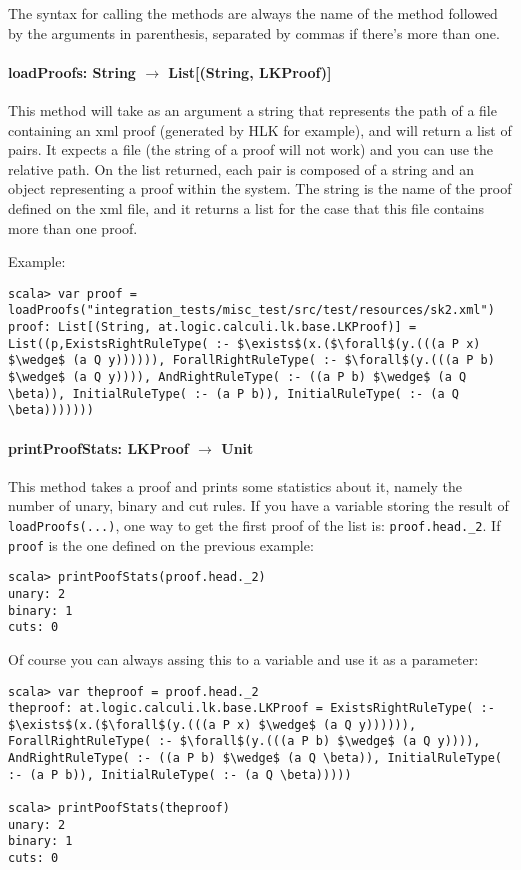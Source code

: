 \documentclass[a4paper, 11pt]{article}
\begin{document}
The syntax for calling the methods are always the name of the method followed by
the arguments in parenthesis, separated by commas if there's more than one.

\paragraph{\textbf{loadProofs: String $\rightarrow$ List[(String, LKProof)]}}
This method will take as an argument a string that represents the path of a file
containing an xml proof (generated by HLK for example), and will return a list 
of pairs. It expects a file (the string of a proof will not work) and you can use 
the relative path. On the list returned, each pair is composed of a string and 
an object representing a proof within the system. The string is the name of the 
proof defined on the xml file, and it returns a list for the case that this file
contains more than one proof.

Example:
\begin{lstlisting}[mathescape]
scala> var proof = loadProofs("integration_tests/misc_test/src/test/resources/sk2.xml")
proof: List[(String, at.logic.calculi.lk.base.LKProof)] = List((p,ExistsRightRuleType( :- $\exists$(x.($\forall$(y.(((a P x) $\wedge$ (a Q y)))))), ForallRightRuleType( :- $\forall$(y.(((a P b) $\wedge$ (a Q y)))), AndRightRuleType( :- ((a P b) $\wedge$ (a Q \beta)), InitialRuleType( :- (a P b)), InitialRuleType( :- (a Q \beta)))))))
\end{lstlisting}

\paragraph{\textbf{printProofStats: LKProof $\rightarrow$ Unit}}
This method takes a proof and prints some statistics about it, namely the number
of unary, binary and cut rules. If you have a variable storing the result of 
\texttt{loadProofs(...)}, one way to get the first proof of the list is: 
\texttt{proof.head.\_2}. If \texttt{proof} is the one defined on the previous 
example:

\begin{lstlisting}
scala> printPoofStats(proof.head._2)
unary: 2
binary: 1
cuts: 0
\end{lstlisting}

Of course you can always assing this to a variable and use it as a parameter:

\begin{lstlisting}
scala> var theproof = proof.head._2
theproof: at.logic.calculi.lk.base.LKProof = ExistsRightRuleType( :- $\exists$(x.($\forall$(y.(((a P x) $\wedge$ (a Q y)))))), ForallRightRuleType( :- $\forall$(y.(((a P b) $\wedge$ (a Q y)))), AndRightRuleType( :- ((a P b) $\wedge$ (a Q \beta)), InitialRuleType( :- (a P b)), InitialRuleType( :- (a Q \beta)))))

scala> printPoofStats(theproof)
unary: 2
binary: 1
cuts: 0
\end{lstlisting}
\end{document}
